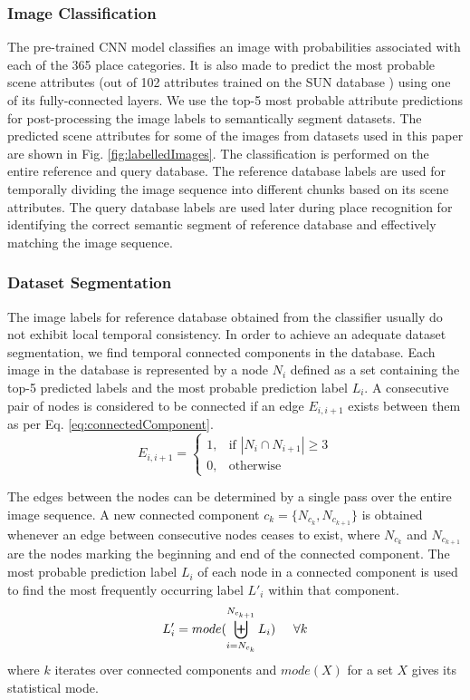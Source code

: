 \documentclass[letterpaper, 10 pt, conference]{ieeeconf}  %
\begin{document}
\subsubsection{Image Classification}
The pre-trained CNN model classifies an image with probabilities associated with each of the 365 place categories. It is also made to predict the most probable scene attributes (out of 102 attributes trained on the SUN database \cite{Patterson2012SunAttributes}) using one of its fully-connected layers. We use the top-5 most probable attribute predictions for post-processing the image labels to semantically segment datasets. The predicted scene attributes for some of the images from datasets used in this paper are shown in Fig. \ref{fig:labelledImages}. The classification is performed on the entire reference and query database. The reference database labels are used for temporally dividing the image sequence into different chunks based on its scene attributes. The query database labels are used later during place recognition for identifying the correct semantic segment of reference database and effectively matching the image sequence.

\subsubsection{Dataset Segmentation}
The image labels for reference database obtained from the classifier usually do not exhibit local temporal consistency. In order to achieve an adequate dataset segmentation, we find temporal connected components in the database. Each image in the database is represented by a node $N_i$ defined as a set containing the top-5 predicted labels and the most probable prediction label $L_i$. A consecutive pair of nodes is considered to be connected if an edge $E_{i,i+1}$ exists between them as per Eq. \ref{eq:connectedComponent}.
\begin{equation}
 E_{i,i+1} = 
 \begin{cases}
  1, & \text{if } \left\vert{N_i \cap N_{i+1}}\right\vert \geq 3\\
  0, & \text{otherwise}
 \end{cases}
 \label{eq:connectedComponent}
\end{equation}

The edges between the nodes can be determined by a single pass over the entire image sequence. A new connected component $c_k = \{N_{c_k},N_{c_{k+1}}\}$ is obtained whenever an edge between consecutive nodes ceases to exist, where $N_{c_k}$ and $N_{c_{k+1}}$ are the nodes marking the beginning and end of the connected component. The most probable prediction label $L_i$ of each node in a connected component is used to find the most frequently occurring label $L'_i$ within that component. 
\begin{equation}
 L'_i = mode(\biguplus\limits_{i=N_{c_k}}^{N_{c_{k+1}}} L_i) \hspace{0.5cm} \forall k
  \label{eq:labelsModeCC}
\end{equation}
where $k$ iterates over connected components and $mode(X)$ for a set $X$ gives its statistical mode.
\end{document}
